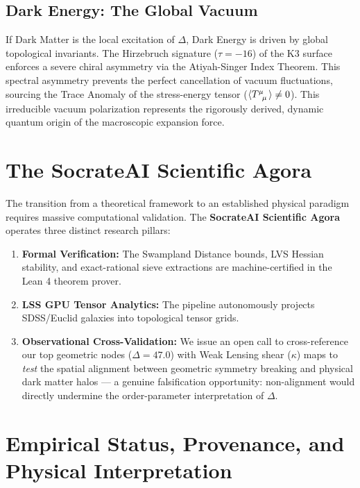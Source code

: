 \documentclass[aps,prd,twocolumn,nofootinbib,superscriptaddress,10pt]{revtex4-2}
\begin{document}
\subsection{Dark Energy: The Global Vacuum}
If Dark Matter is the local excitation of $\Delta$, Dark Energy is driven by global topological invariants. The Hirzebruch signature ($\tau = -16$) of the K3 surface enforces a severe chiral asymmetry via the Atiyah-Singer Index Theorem. This spectral asymmetry prevents the perfect cancellation of vacuum fluctuations, sourcing the Trace Anomaly of the stress-energy tensor ($\langle \tensor{T}{^\mu_\mu} \rangle \neq 0$). This irreducible vacuum polarization represents the rigorously derived, dynamic quantum origin of the macroscopic expansion force.

\section{The SocrateAI Scientific Agora}
The transition from a theoretical framework to an established physical paradigm requires massive computational validation. The \textbf{SocrateAI Scientific Agora} operates three distinct research pillars:
\begin{enumerate}
    \item \textbf{Formal Verification:} The Swampland Distance bounds, LVS Hessian stability, and exact-rational sieve extractions are machine-certified in the Lean 4 theorem prover.
    \item \textbf{LSS GPU Tensor Analytics:} The pipeline autonomously projects SDSS/Euclid galaxies into topological tensor grids.
    \item \textbf{Observational Cross-Validation:} We issue an open call to cross-reference our top geometric nodes ($\Delta = 47.0$) with Weak Lensing shear ($\kappa$) maps to \emph{test} the spatial alignment between geometric symmetry breaking and physical dark matter halos --- a genuine falsification opportunity: non-alignment would directly undermine the order-parameter interpretation of $\Delta$.
\end{enumerate}

\section{Empirical Status, Provenance, and Physical Interpretation}\label{sec:provenance}
\end{document}
